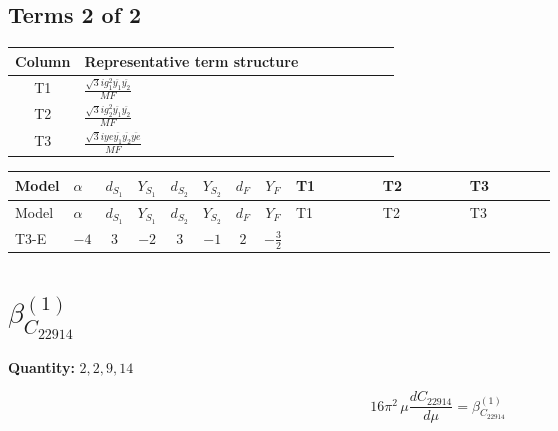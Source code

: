 \documentclass[8pt]{article}
\begin{document}
\begin{landscape}
\subsection*{Terms 2 of 2}
\begin{center}
\begin{tabular}{@{}c >{\raggedright\arraybackslash}p{0.82\linewidth}@{}}
\toprule
Column & Representative term structure \\
\midrule
T1 & \(\displaystyle \frac{\sqrt{3} i g_{1}^{2} \overline{y_{1}} \overline{y_{2}}}{MF}\) \\
\midrule
T2 & \(\displaystyle \frac{\sqrt{3} i g_{2}^{2} \overline{y_{1}} \overline{y_{2}}}{MF}\) \\
\midrule
T3 & \(\displaystyle \frac{\sqrt{3} i ye \overline{y_{1}} \overline{y_{2}} \overline{ye}}{MF}\) \\
\midrule
\bottomrule
\end{tabular}
\end{center}
\smallskip
\tiny
\begin{longtable}{@{}llcccccc >{\raggedright\arraybackslash}p{0.21\linewidth} >{\raggedright\arraybackslash}p{0.21\linewidth} >{\raggedright\arraybackslash}p{0.21\linewidth}@{}}
\toprule
Model & $\alpha$ & $d_{S_1}$ & $Y_{S_1}$ & $d_{S_2}$ & $Y_{S_2}$ & $d_F$ & $Y_F$ & T1 & T2 & T3 \\
\midrule
\endfirsthead
\toprule
Model & $\alpha$ & $d_{S_1}$ & $Y_{S_1}$ & $d_{S_2}$ & $Y_{S_2}$ & $d_F$ & $Y_F$ & T1 & T2 & T3 \\
\midrule
\endhead
T3-E & $-4$ & $3$ & $-2$ & $3$ & $-1$ & $2$ & $-\frac{3}{2}$ & \scriptsize\adjustbox{max width=\linewidth}{$\begin{gathered} \frac{9 \sqrt{3} i g_{1}^{2} \overline{y_{1}} \overline{y_{2}}}{8 MF}\end{gathered}$} & \scriptsize\adjustbox{max width=\linewidth}{$\begin{gathered} \frac{11 \sqrt{3} i g_{2}^{2} \overline{y_{1}} \overline{y_{2}}}{8 MF}\end{gathered}$} & \scriptsize\adjustbox{max width=\linewidth}{$\begin{gathered} - \frac{\sqrt{3} i ye \overline{y_{1}} \overline{y_{2}} \overline{ye}}{12 MF}\end{gathered}$} \\
\midrule
\bottomrule
\end{longtable}
\clearpage
\section*{$\beta_{C_{22914}}^{(1)}$}
\noindent\textbf{Quantity: }$\mathrm{2,2,9,14}$\par\smallskip
\[16\pi^2\,\mu\frac{d C_{22914}}{d\mu}=\beta_{C_{22914}}^{(1)}\]

\end{landscape}
\end{document}
